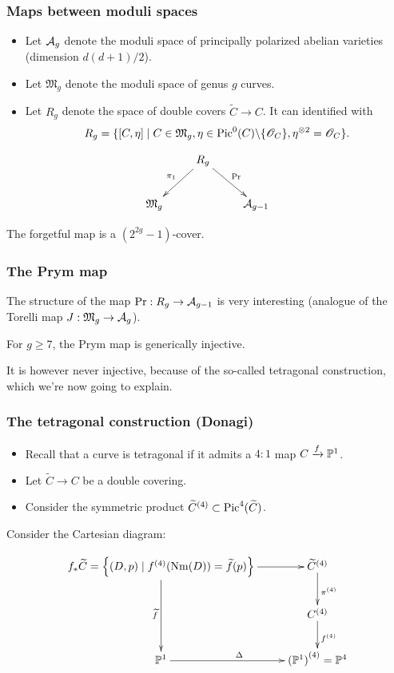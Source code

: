 \begin{frame}
\frametitle{Maps between moduli spaces}

\begin{itemize}
	\item Let $\A_g$ denote the moduli space of principally polarized abelian varieties (dimension $d(d+1)/2$).
	\pause
	\item Let $\mathfrak M_g$ denote the moduli space of genus $g$ curves.
	\pause
	\item Let $R_g$ denote the space of double covers $\widetilde C \to C$. It can identified with
	\[
	R_g = \{ [C,\eta] \mid C \in \mathfrak M_g, \eta \in \Pic^0(C) \backslash \{ \OO_C\}, \eta^{\otimes 2}=\OO_C \}.
	\]
\end{itemize}
\pause


\begin{center}
\[
\xymatrix{
 & R_g \ar[dl]_{\pi_1} \ar[dr]^{\Pr}  & \\
\mathfrak M_g & & \A_{g-1}
}
\]
\end{center}

The forgetful map is a $(2^{2g}-1)$-cover. 

\end{frame}


\begin{frame}
\frametitle{The Prym map}

The structure of the map $\Pr:R_g \to \A_{g-1}$ is very interesting (analogue of the Torelli map $J:\mathfrak M_g \to \A_g$).

\pause

\begin{theorem}

For $g \geq 7$, the Prym map is generically injective. 

\end{theorem}
\pause

It is however \alert{never} injective, because of the so-called \alert{tetragonal construction}, which we're now going to explain.
\end{frame}

\begin{frame}
\frametitle{The tetragonal construction (Donagi)}

\begin{itemize}
	\item Recall that a curve is \alert{tetragonal} if it admits a $4:1$ map $C \xrightarrow{f} \P^1$.
	\pause
	\item Let $\widetilde C \to C$ be a double covering.
	\pause
	\item Consider the symmetric product ${\widetilde C}^{(4)} \subset \Pic^4(\widetilde C)$.
\end{itemize}
\pause

Consider the Cartesian diagram:

\[
\xymatrix{
f_\ast \widetilde C = \left\{ (D,p) \mid f^{(4)}(\Nm(D)) = \widetilde f (p) \right\} \ar[r] \ar[dd]_{\widetilde f} & {\widetilde C}^{(4)} \ar[d]^{\pi^{(4)}} \\
 & C^{(4)} \ar[d]^{f^{(4)}} \\
\P^1 \ar[r]^\Delta & {(\P^1)}^{(4)} = \P^4
}
\]
\end{frame}


